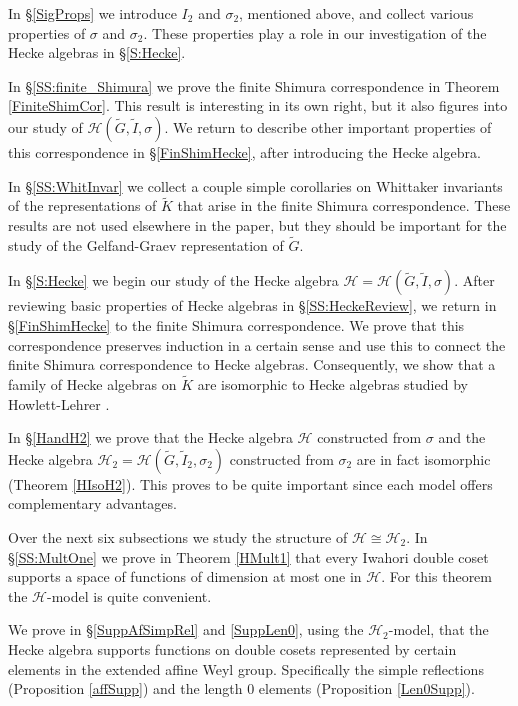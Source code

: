 \documentclass[10pt, letterpaper]{amsart}
\theoremstyle{plain}
\theoremstyle{definition}
\numberwithin{equation}{section}
\newcommand{\Gt}{\widetilde{G}}
\newcommand{\It}{\widetilde{I}}
\newcommand{\Kt}{\widetilde{K}}
\newcommand{\Hcal}{\mathcal{H}}
\begin{document}
In \S \ref{SigProps} we introduce $I_{2}$ and $\sigma_{2}$, mentioned above, and collect various properties of $\sigma$ and $\sigma_{2}$. These properties play a role in our investigation of the Hecke algebras in \S \ref{S:Hecke}.

In \S \ref{SS:finite_Shimura} we prove the finite Shimura correspondence in Theorem \ref{FiniteShimCor}. This result is interesting in its own right, but it also figures into our study of $\Hcal(\Gt,\It,\sigma)$. We return to describe other important properties of this correspondence in \S \ref{FinShimHecke}, after introducing the Hecke algebra.

In \S \ref{SS:WhitInvar} we collect a couple simple corollaries on Whittaker invariants of the representations of $\Kt$ that arise in the finite Shimura correspondence. These results are not used elsewhere in the paper, but they should be important for the study of the Gelfand-Graev representation of $\Gt$. 

In \S \ref{S:Hecke} we begin our study of the Hecke algebra $\Hcal=\Hcal(\Gt,\It,\sigma)$. After reviewing basic properties of Hecke algebras in \S \ref{SS:HeckeReview}, we return in \S \ref{FinShimHecke} to the finite Shimura correspondence. We prove that this correspondence preserves induction in a certain sense and use this to connect the finite Shimura correspondence to Hecke algebras. Consequently, we show that a family of Hecke algebras on $\Kt$ are isomorphic to Hecke algebras studied by Howlett-Lehrer \cite{HL80}.

In \S \ref{HandH2} we prove that the Hecke algebra $\Hcal$ constructed from $\sigma$ and the Hecke algebra $\Hcal_{2}=\Hcal(\Gt,\It_{2},\sigma_{2})$ constructed from $\sigma_{2}$ are in fact isomorphic (Theorem \ref{HIsoH2}). This proves to be quite important since each model offers complementary advantages. 

Over the next six subsections we study the structure of $\Hcal\cong \Hcal_{2}$. In \S \ref{SS:MultOne} we prove in Theorem \ref{HMult1} that every Iwahori double coset supports a space of functions of dimension at most one in $\Hcal$. For this theorem the $\Hcal$-model is quite convenient.

We prove in \S \ref{SuppAfSimpRel} and \ref{SuppLen0}, using the $\Hcal_{2}$-model, that the Hecke algebra supports functions on double cosets represented by certain elements in the extended affine Weyl group. Specifically the simple reflections (Proposition \ref{affSupp}) and the length $0$ elements (Proposition \ref{Len0Supp}).
\end{document}
